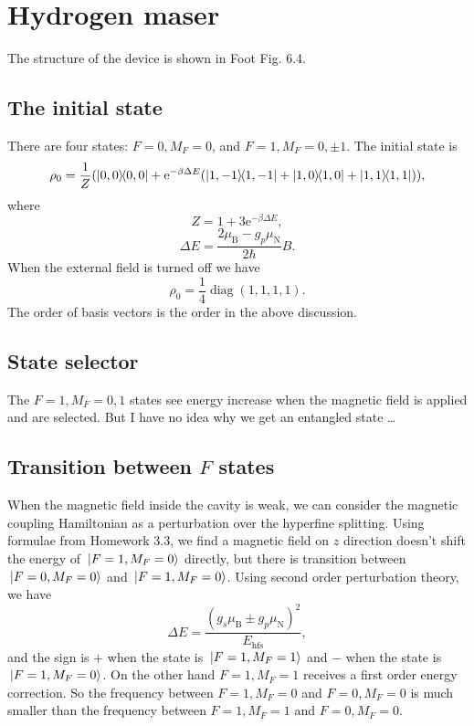 \documentclass[hyperref, a4paper]{article}
\DeclareMathOperator{\diag}{diag}
\newcommand*{\ee}{\mathrm{e}}
\newcommand*{\muB}{\mu_{\text{B}}}
\newcommand*{\muN}{\mu_{\text{N}}}
\begin{document}
\section{Hydrogen maser}

The structure of the device is shown in Foot Fig. 6.4.

\subsection{The initial state}

There are four states: $F = 0, M_F = 0$, 
and $F = 1, M_F = 0, \pm 1$.
The initial state is 
\begin{equation}
    \rho_0 = \frac{1}{Z} (\dyad{0, 0} + \ee^{- \beta \Delta E} (\dyad{1, -1} + \dyad{1, 0} + \dyad{1, 1})),
\end{equation}
where 
\begin{equation}
    Z = 1 + 3 \ee^{- \beta \Delta E},
\end{equation}
\begin{equation}
    \Delta E = \frac{2 \muB - g_p \muN}{2 \hbar} B.
\end{equation}
When the external field is turned off we have 
\begin{equation}
    \rho_0 = \frac{1}{4} \diag(1, 1, 1, 1).
\end{equation}
The order of basis vectors is the order in the above discussion.

\subsection{State selector}

The $F = 1, M_F = 0, 1$ states see energy increase when the magnetic field is applied 
and are selected.
But I have no idea why we get an entangled state \dots

\subsection{Transition between $F$ states}

When the magnetic field inside the cavity is weak, 
we can consider the magnetic coupling Hamiltonian 
as a perturbation over the hyperfine splitting.
Using formulae from Homework 3.3,
we find a magnetic field on $z$ direction 
doesn't shift the energy of $\ket*{F = 1, M_F = 0}$ directly,
but there is transition between $\ket*{F = 0, M_F = 0}$
and $\ket*{F = 1, M_F = 0}$.
Using second order perturbation theory, we have 
\begin{equation}
    \Delta E = \frac{(g_{s} \mu_{\text{B}} \pm g_{p} \mu_{\text{N}} )^2}{E_{\text{hfs}}},
\end{equation}
and the sign is $+$ when the state is $\ket*{F = 1, M_F = 1}$
and $-$ when the state is $\ket*{F = 1, M_F = 0}$.
On the other hand $F = 1, M_F = 1$ receives a 
first order energy correction.
So the frequency between $F = 1, M_F = 0$ and $F=0, M_F = 0$ 
is much smaller than the frequency between $F = 1, M_F = 1$ and $F = 0, M_F = 0$.
\end{document}
